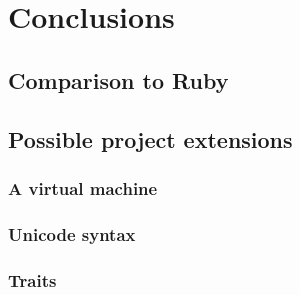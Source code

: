 \section{Conclusions}

\subsection{Comparison to Ruby}
\label{sec:ruby_comparison}

\subsection{Possible project extensions}

\subsubsection{A virtual machine}

\subsubsection{Unicode syntax}

\subsubsection{Traits}
